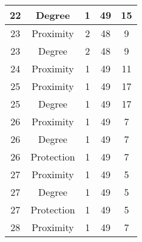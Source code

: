 \documentclass[results.tex]{subfiles}
\begin{document}
\begin{center}
\begin{tabular}{| c || c | c | c | c |}
            \hline
            22                      & Degree                       & 1                      & 49                      & 15                   \\
            \hline
            23                      & Proximity                    & 2                      & 48                      & 9                    \\
            \hline
            23                      & Degree                       & 2                      & 48                      & 9                    \\
            \hline
            24                      & Proximity                    & 1                      & 49                      & 11                   \\
            \hline
            25                      & Proximity                    & 1                      & 49                      & 17                   \\
            \hline
            25                      & Degree                       & 1                      & 49                      & 17                   \\
            \hline
            26                      & Proximity                    & 1                      & 49                      & 7                    \\
            \hline
            26                      & Degree                       & 1                      & 49                      & 7                    \\
            \hline
            26                      & Protection                   & 1                      & 49                      & 7                    \\
            \hline
            27                      & Proximity                    & 1                      & 49                      & 5                    \\
            \hline
            27                      & Degree                       & 1                      & 49                      & 5                    \\
            \hline
            27                      & Protection                   & 1                      & 49                      & 5                    \\
            \hline
            28                      & Proximity                    & 1                      & 49                      & 7                    \\

\end{tabular}
\end{center}
\end{document}
